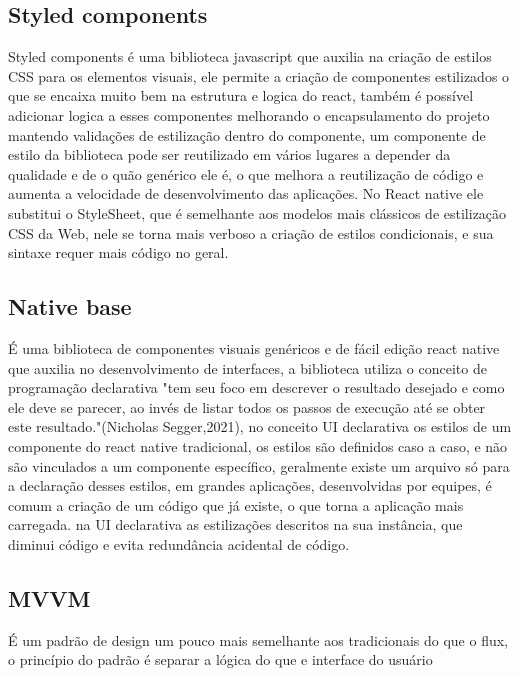 \documentclass{ufersa}
\begin{document}
\subsection{Styled components}

Styled components é uma biblioteca javascript que auxilia na criação de estilos CSS para os elementos visuais, ele permite a criação de componentes estilizados o que se encaixa muito bem na estrutura e logica do react, também é possível adicionar logica a esses componentes melhorando o encapsulamento do projeto mantendo validações de estilização dentro do componente, um componente de estilo da biblioteca pode ser reutilizado em vários lugares a depender da qualidade e de o quão genérico ele é, o que melhora a reutilização de código e aumenta a velocidade de desenvolvimento das aplicações. No React native ele substitui o StyleSheet, que é semelhante aos modelos mais clássicos de estilização CSS da Web, nele se torna mais verboso a criação de estilos condicionais, e sua sintaxe requer mais código no geral.

\subsection{Native base}

É uma biblioteca de componentes visuais genéricos e de fácil edição react native que auxilia no desenvolvimento de interfaces, a biblioteca utiliza o conceito de programação declarativa "tem seu foco em descrever o resultado desejado e como ele deve se parecer, ao invés de listar todos os passos de execução até se obter este resultado."(Nicholas Segger,2021), no conceito UI declarativa os estilos de um componente do react native tradicional, os estilos são definidos caso a caso, e não são vinculados a um componente específico, geralmente existe um arquivo só para a declaração desses estilos, em grandes aplicações, desenvolvidas por equipes, é comum a criação de um código que já existe, o que torna a aplicação mais carregada. na UI declarativa as estilizações descritos na sua instância, que diminui código e evita redundância acidental de código.  

\subsection{MVVM}
 É um padrão de design um pouco mais semelhante aos tradicionais do que o flux, o princípio do padrão é separar a lógica do que e interface do usuário
\end{document}
